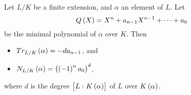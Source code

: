 \pagebreak


\begin{proposition}
\label{prop:12.2.2}
Let $ L / K $ be a finite extension, and $ \alpha $ an element of $ L $. Let
$$ Q\br{X} = X^n + a_{n - 1}X^{n - 1} + \dots + a_0 $$
be the minimal polynomial of $ \alpha $ over $ K $. Then
\begin{itemize}
\item $ Tr_{L / K}\br{\alpha} = -da_{n - 1} $, and
\item $ N_{L / K}\br{\alpha} = \br{\br{-1}^na_0}^d $,
\end{itemize}
where $ d $ is the degree $ \sbr{L : K\br{\alpha}} $ of $ L $ over $ K\br{\alpha} $.
\end{proposition}

